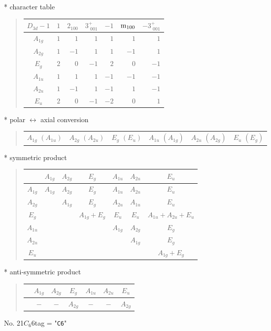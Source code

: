 \documentclass[fleqn,10pt,landscape]{jsarticle}
\begin{document}
* character table
\begin{quote}
\begin{tabular}{crrrrrr} \hline \hline
$ D_{3d}-1 $ & $ 1 $ & $ 2{}_{100} $ & $ 3^{+}_{\,\,001} $ & $ -1 $ & $ {\rm m}_{100} $ & $ -3^{+}_{\,\,001} $ \\ \hline
$ A_{1g} $ & $ 1 $ & $ 1 $ & $ 1 $ & $ 1 $ & $ 1 $ & $ 1 $ \\
$ A_{2g} $ & $ 1 $ & $ -1 $ & $ 1 $ & $ 1 $ & $ -1 $ & $ 1 $ \\
$ E_{g} $ & $ 2 $ & $ 0 $ & $ -1 $ & $ 2 $ & $ 0 $ & $ -1 $ \\
$ A_{1u} $ & $ 1 $ & $ 1 $ & $ 1 $ & $ -1 $ & $ -1 $ & $ -1 $ \\
$ A_{2u} $ & $ 1 $ & $ -1 $ & $ 1 $ & $ -1 $ & $ 1 $ & $ -1 $ \\
$ E_{u} $ & $ 2 $ & $ 0 $ & $ -1 $ & $ -2 $ & $ 0 $ & $ 1 $ \\
 \hline \hline
\end{tabular}
\end{quote}
* polar $\leftrightarrow$ axial conversion
\begin{quote}
\begin{tabular}{cccccc}
$ A_{1g}\,\,(A_{1u}) $ & $ A_{2g}\,\,(A_{2u}) $ & $ E_{g}\,\,(E_{u}) $ & $ A_{1u}\,\,(A_{1g}) $ & $ A_{2u}\,\,(A_{2g}) $ & $ E_{u}\,\,(E_{g}) $
\end{tabular}
\end{quote}
* symmetric product
\begin{quote}
\begin{tabular}{c|cccccc} \hline \hline
 & $ A_{1g} $ & $ A_{2g} $ & $ E_{g} $ & $ A_{1u} $ & $ A_{2u} $ & $ E_{u} $ \\ \hline
$ A_{1g} $ & $ A_{1g} $ & $ A_{2g} $ & $ E_{g} $ & $ A_{1u} $ & $ A_{2u} $ & $ E_{u} $ \\
$ A_{2g} $ & $  $ & $ A_{1g} $ & $ E_{g} $ & $ A_{2u} $ & $ A_{1u} $ & $ E_{u} $ \\
$ E_{g} $ & $  $ & $  $ & $ A_{1g} + E_{g} $ & $ E_{u} $ & $ E_{u} $ & $ A_{1u} + A_{2u} + E_{u} $ \\
$ A_{1u} $ & $  $ & $  $ & $  $ & $ A_{1g} $ & $ A_{2g} $ & $ E_{g} $ \\
$ A_{2u} $ & $  $ & $  $ & $  $ & $  $ & $ A_{1g} $ & $ E_{g} $ \\
$ E_{u} $ & $  $ & $  $ & $  $ & $  $ & $  $ & $ A_{1g} + E_{g} $ \\
 \hline \hline
\end{tabular}
\end{quote}
* anti-symmetric product
\begin{quote}
\begin{tabular}{ccccccc} \hline \hline
 & $ A_{1g} $ & $ A_{2g} $ & $ E_{g} $ & $ A_{1u} $ & $ A_{2u} $ & $ E_{u} $ \\ \hline
$  $ & $ - $ & $ - $ & $ A_{2g} $ & $ - $ & $ - $ & $ A_{2g} $ \\
 \hline \hline
\end{tabular}
\end{quote}
\newpage
No. 21\quad$C_{6}$\quad$6$\quad[ hexagonal ]
tag = "{\tt C6}"
\end{document}
